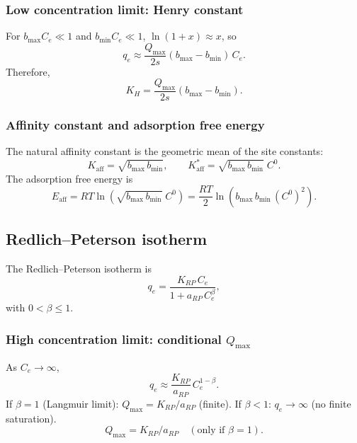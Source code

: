 \documentclass[journal=aamick,manuscript=article]{achemso}
\begin{document}
\subsubsection{Low concentration limit: Henry constant}

For $b_{\max}C_e \ll 1$ and $b_{\min}C_e \ll 1$,
$\ln(1+x) \approx x$, so
\begin{equation}
	q_e \approx \frac{Q_{\max}}{2s}(b_{\max} - b_{\min})\, C_e.
\end{equation}
Therefore,
\begin{equation}
	\boxed{K_H = \frac{Q_{\max}}{2s}(b_{\max} - b_{\min}).}
\end{equation}

\subsubsection{Affinity constant and adsorption free energy}

The natural affinity constant is the geometric mean of the site constants:
\begin{equation}
	K_{\mathrm{aff}} = \sqrt{b_{\max}\, b_{\min}},
	\qquad
	K_{\mathrm{aff}}^{\ast} = \sqrt{b_{\max}\, b_{\min}}\; C^0.
\end{equation}
The adsorption free energy is
\begin{equation}
	\boxed{
		E_{\mathrm{aff}} = RT\ln\!\left(\sqrt{b_{\max}\, b_{\min}}\; C^0\right)
		= \frac{RT}{2}\ln\!\left(b_{\max}\, b_{\min}\, (C^0)^2\right).
	}
\end{equation}

\subsection{Redlich--Peterson isotherm}
\label{sec:si_redlich_peterson}

The Redlich--Peterson isotherm is
\begin{equation}
	q_e = \frac{K_{RP}\, C_e}{1 + a_{RP}\, C_e^{\beta}},
	\label{eq:si_redlich_peterson}
\end{equation}
with $0 < \beta \leq 1$.

\subsubsection{High concentration limit: conditional $Q_{\max}$}

As $C_e \to \infty$,
\begin{equation}
	q_e \approx \frac{K_{RP}}{a_{RP}}\, C_e^{1-\beta}.
\end{equation}
If $\beta = 1$ (Langmuir limit): $Q_{\max} = K_{RP}/a_{RP}$ (finite).
If $\beta < 1$: $q_e \to \infty$ (no finite saturation).
\begin{equation}
	\boxed{Q_{\max} = K_{RP}/a_{RP} \quad (\text{only if } \beta = 1).}
\end{equation}
\end{document}
